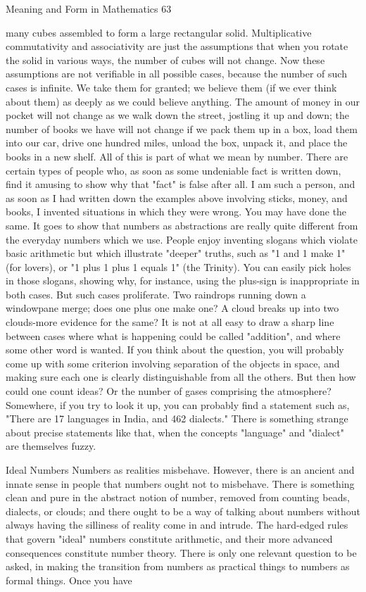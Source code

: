 Meaning and Form in Mathematics                                                            63

many cubes assembled to form a large rectangular solid. Multiplicative commutativity
and associativity are just the assumptions that when you rotate the solid in various ways,
the number of cubes will not change. Now these assumptions are not verifiable in all
possible cases, because the number of such cases is infinite. We take them for granted;
we believe them (if we ever think about them) as deeply as we could believe anything.
The amount of money in our pocket will not change as we walk down the street, jostling
it up and down; the number of books we have will not change if we pack them up in a
box, load them into our car, drive one hundred miles, unload the box, unpack it, and place
the books in a new shelf. All of this is part of what we mean by number.
        There are certain types of people who, as soon as some undeniable fact is written
down, find it amusing to show why that "fact" is false after all. I am such a person, and as
soon as I had written down the examples above involving sticks, money, and books, I
invented situations in which they were wrong. You may have done the same. It goes to
show that numbers as abstractions are really quite different from the everyday numbers
which we use.
        People enjoy inventing slogans which violate basic arithmetic but which illustrate
"deeper" truths, such as "1 and 1 make 1" (for lovers), or "1 plus 1 plus 1 equals 1" (the
Trinity). You can easily pick holes in those slogans, showing why, for instance, using the
plus-sign is inappropriate in both cases. But such cases proliferate. Two raindrops
running down a windowpane merge; does one plus one make one? A cloud breaks up into
two clouds-more evidence for the same? It is not at all easy to draw a sharp line between
cases where what is happening could be called "addition", and where some other word is
wanted. If you think about the question, you will probably come up with some criterion
involving separation of the objects in space, and making sure each one is clearly
distinguishable from all the others. But then how could one count ideas? Or the number
of gases comprising the atmosphere? Somewhere, if you try to look it up, you can
probably find a statement such as, "There are 17 languages in India, and 462 dialects."
There is something strange about precise statements like that, when the concepts
"language" and "dialect" are themselves fuzzy.

                                        Ideal Numbers
        Numbers as realities misbehave. However, there is an ancient and innate sense in
people that numbers ought not to misbehave. There is something clean and pure in the
abstract notion of number, removed from counting beads, dialects, or clouds; and there
ought to be a way of talking about numbers without always having the silliness of reality
come in and intrude. The hard-edged rules that govern "ideal" numbers constitute
arithmetic, and their more advanced consequences constitute number theory. There is
only one relevant question to be asked, in making the transition from numbers as
practical things to numbers as formal things. Once you have




